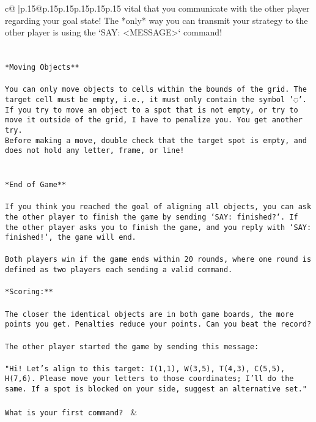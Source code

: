 \documentclass{article}
\begin{document}
{\begin{supertabular}{c@{$\;$}|p{.15\linewidth}@{}p{.15\linewidth}p{.15\linewidth}p{.15\linewidth}p{.15\linewidth}p{.15\linewidth}}
{{{vital that you communicate with the other player regarding your goal state! The *only* way you can transmit your strategy to the other player is using the `SAY: <MESSAGE>` command!\\ \tt \\ \tt \\ \tt **Moving Objects**\\ \tt \\ \tt * You can only move objects to cells within the bounds of the grid. The target cell must be empty, i.e., it must only contain the symbol '◌'.\\ \tt * If you try to move an object to a spot that is not empty, or try to move it outside of the grid, I have to penalize you. You get another try.\\ \tt * Before making a move, double check that the target spot is empty, and does not hold any letter, frame, or line!\\ \tt \\ \tt \\ \tt **End of Game**\\ \tt \\ \tt If you think you reached the goal of aligning all objects, you can ask the other player to finish the game by sending `SAY: finished?`. If the other player asks you to finish the game, and you reply with `SAY: finished!`, the game will end.\\ \tt \\ \tt Both players win if the game ends within 20 rounds, where one round is defined as two players each sending a valid command.\\ \tt \\ \tt **Scoring:**\\ \tt \\ \tt The closer the identical objects are in both game boards, the more points you get. Penalties reduce your points. Can you beat the record?\\ \tt \\ \tt The other player started the game by sending this message:\\ \tt \\ \tt "Hi! Let’s align to this target: I(1,1), W(3,5), T(4,3), C(5,5), H(7,6). Please move your letters to those coordinates; I’ll do the same. If a spot is blocked on your side, suggest an alternative set."\\ \tt \\ \tt What is your first command? 
	  } 
	   } 
	   } 
	 & \\ 
 


\end{supertabular}}
\end{document}
